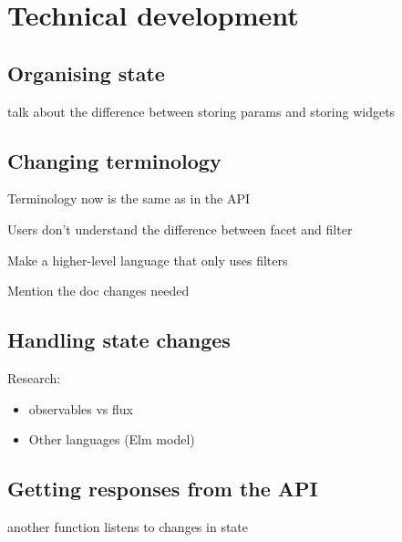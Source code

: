 
\chapter{Technical development} %
\label{chp:execution}

\section{Organising state} %
\label{sec:organising_state}



talk about the difference between storing params and storing widgets


\section{Changing terminology} %
\label{sec:changing_terminology}

Terminology now is the same as in the API

Users don't understand the difference between facet and filter

Make a higher-level language that only uses filters

Mention the doc changes needed


\section{Handling state changes} %
\label{sec:handling_state_changes}

Research:

\begin{itemize}
  \item observables vs flux
  \item Other languages (Elm model)\cite{csstricks-elm}
\end{itemize}


\section{Getting responses from the API} %
\label{sec:getting_responses_from_the_api}

another function listens to changes in state

